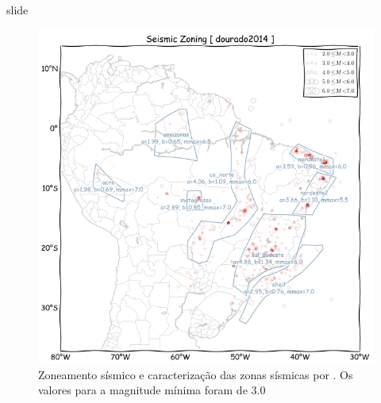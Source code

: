 \documentclass[ucs,8pt]{beamer}
\begin{document}
\begin{frame}{slide}

\begin{figure}[H]
  \centering
  \includegraphics[height=.80\textheight]{a_dourado} 
  \caption{Zoneamento sísmico e caracterização das zonas sísmicas por \citep{dourado_2014}.
  Os valores para a magnitude mínima foram de 3.0}
  \label{fig:a_dourado} 
\end{figure}



\end{frame}
\end{document}
